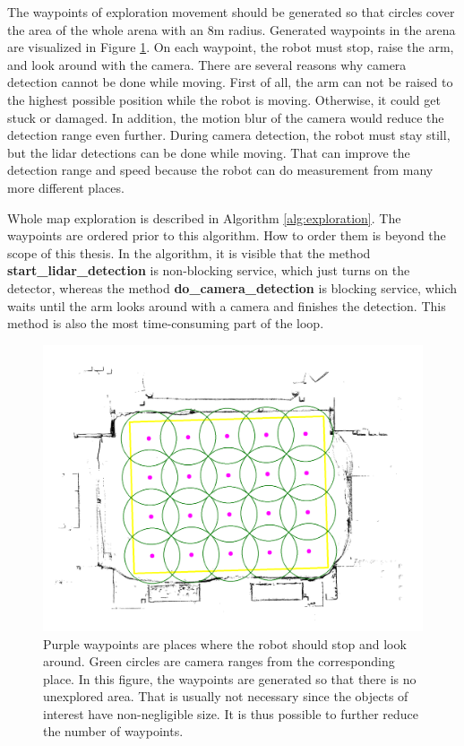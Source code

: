 The waypoints of exploration movement should be generated so that circles cover the area of the whole arena with an $8$m radius. Generated waypoints in the arena are visualized in Figure \ref{fig:map_annot}. On each waypoint, the robot must stop, raise the arm, and look around with the camera. There are several reasons why camera detection cannot be done while moving. First of all, the arm can not be raised to the highest possible position while the robot is moving. Otherwise, it could get stuck or damaged. In addition, the motion blur of the camera would reduce the detection range even further. During camera detection, the robot must stay still, but the lidar detections can be done while moving. That can improve the detection range and speed because the robot can do measurement from many more different places. 

Whole map exploration is described in Algorithm \ref{alg:exploration}. The waypoints are ordered prior to this algorithm. How to order them is beyond the scope of this thesis. In the algorithm, it is visible that the method \textbf{start\_lidar\_detection} is non-blocking service, which just turns on the detector, whereas the method \textbf{do\_camera\_detection} is blocking service, which waits until the arm looks around with a camera and finishes the detection. This method is also the most time-consuming part of the loop.

\begin{figure}[H]
	\centering
	\includegraphics[scale=0.23]{fig/map_annotation.png}
	\caption[Generated waypoints]{Purple waypoints are places where the robot should stop and look around. Green circles are camera ranges from the corresponding place. In this figure, the waypoints are generated so that there is no unexplored area. That is usually not necessary since the objects of interest have non-negligible size. It is thus possible to further reduce the number of waypoints.}
	\label{fig:map_annot}
\end{figure}

